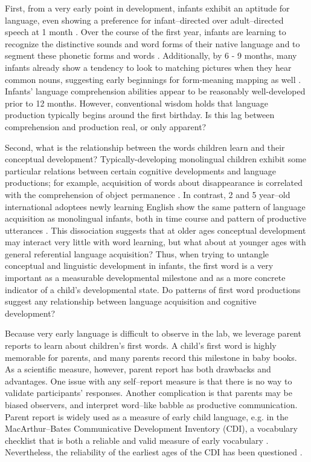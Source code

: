\documentclass[10pt,letterpaper]{article}
\begin{document}
First, from a very early point in development, infants exhibit an aptitude for language, even showing a preference for infant--directed over adult--directed speech at 1 month \cite{cooper1990}. Over the course of the first year, infants are learning to recognize the distinctive sounds and word forms of their native language \cite{kuhl2004} and to segment these phonetic forms and words \cite{werker2005}. Additionally, by 6 - 9 months, many infants already show a tendency to look to matching pictures when they hear common nouns, suggesting early beginnings for form-meaning mapping as well \cite{bergelson2012}. Infants' language comprehension abilities appear to be reasonably well-developed prior to 12 months. However, conventional wisdom holds that language production typically begins around the first birthday. Is this lag between comprehension and production real, or only apparent?

Second, what is the relationship between the words children learn and their conceptual development? Typically-developing monolingual children exhibit some particular relations between certain cognitive developments and language productions; for example, acquisition of words about disappearance is correlated with the comprehension of object permanence \cite{gopnik1996}. In contrast, 2 and 5 year--old international adoptees newly learning English show the same pattern of language acquisition as monolingual infants, both in time course and pattern of productive utterances \cite{snedeker2007}. This dissociation suggests that at older ages conceptual development may interact very little with word learning, but what about at younger ages with general referential language acquisition? Thus, when trying to untangle conceptual and linguistic development in infants, the first word is a very important as a measurable developmental milestone and as a more concrete indicator of a child's developmental state. Do patterns of first word productions suggest any relationship between language acquisition and cognitive development? 

Because very early language is difficult to observe in the lab, we leverage parent reports to learn about children's first words. A child's first word is highly memorable for parents, and many parents record this milestone in baby books. As a scientific measure, however, parent report has both drawbacks and advantages. One issue with any self--report measure is that there is no way to validate participants' responses. Another complication is that parents may be biased observers, and interpret word--like babble as productive communication. Parent report is widely used as a measure of early child language, e.g. in the MacArthur--Bates Communicative Development Inventory (CDI), a vocabulary checklist that is both a reliable and valid measure of early vocabulary \cite{fenson1994,fenson2007}. Nevertheless, the reliability of the earliest ages of the CDI has been questioned \cite{feldman2000}.
\end{document}
